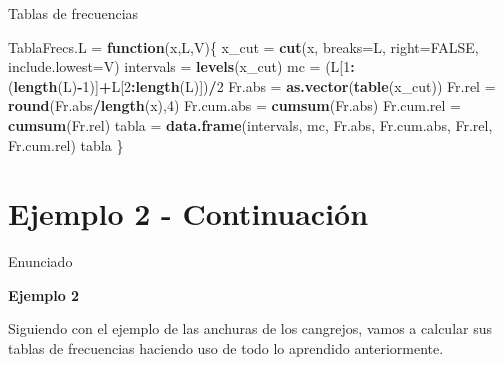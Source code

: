 \documentclass[
  ignorenonframetext,
]{beamer}
\newenvironment{Shaded}{\begin{snugshade}}{\end{snugshade}}
\newcommand{\ControlFlowTok}[1]{\textcolor[rgb]{0.13,0.29,0.53}{\textbf{#1}}}
\newcommand{\DataTypeTok}[1]{\textcolor[rgb]{0.13,0.29,0.53}{#1}}
\newcommand{\DecValTok}[1]{\textcolor[rgb]{0.00,0.00,0.81}{#1}}
\newcommand{\KeywordTok}[1]{\textcolor[rgb]{0.13,0.29,0.53}{\textbf{#1}}}
\newcommand{\NormalTok}[1]{#1}
\newcommand{\OperatorTok}[1]{\textcolor[rgb]{0.81,0.36,0.00}{\textbf{#1}}}
\newcommand{\OtherTok}[1]{\textcolor[rgb]{0.56,0.35,0.01}{#1}}
\newcommand{\StringTok}[1]{\textcolor[rgb]{0.31,0.60,0.02}{#1}}
\begin{document}
\begin{frame}[fragile]{Tablas de frecuencias}
\protect\hypertarget{tablas-de-frecuencias}{}

\begin{Shaded}
\begin{Highlighting}[]
\NormalTok{TablaFrecs.L =}\StringTok{ }\ControlFlowTok{function}\NormalTok{(x,L,V)\{}
\NormalTok{  x_cut =}\StringTok{ }\KeywordTok{cut}\NormalTok{(x, }\DataTypeTok{breaks=}\NormalTok{L, }\DataTypeTok{right=}\OtherTok{FALSE}\NormalTok{, }\DataTypeTok{include.lowest=}\NormalTok{V)}
\NormalTok{  intervals =}\StringTok{ }\KeywordTok{levels}\NormalTok{(x_cut)}
\NormalTok{  mc =}\StringTok{ }\NormalTok{(L[}\DecValTok{1}\OperatorTok{:}\NormalTok{(}\KeywordTok{length}\NormalTok{(L)}\OperatorTok{-}\DecValTok{1}\NormalTok{)]}\OperatorTok{+}\NormalTok{L[}\DecValTok{2}\OperatorTok{:}\KeywordTok{length}\NormalTok{(L)])}\OperatorTok{/}\DecValTok{2}
\NormalTok{  Fr.abs =}\StringTok{ }\KeywordTok{as.vector}\NormalTok{(}\KeywordTok{table}\NormalTok{(x_cut)) }
\NormalTok{  Fr.rel =}\StringTok{ }\KeywordTok{round}\NormalTok{(Fr.abs}\OperatorTok{/}\KeywordTok{length}\NormalTok{(x),}\DecValTok{4}\NormalTok{)}
\NormalTok{  Fr.cum.abs =}\StringTok{ }\KeywordTok{cumsum}\NormalTok{(Fr.abs)}
\NormalTok{  Fr.cum.rel =}\StringTok{ }\KeywordTok{cumsum}\NormalTok{(Fr.rel)}
\NormalTok{  tabla =}\StringTok{ }\KeywordTok{data.frame}\NormalTok{(intervals, mc, Fr.abs, Fr.cum.abs, Fr.rel, Fr.cum.rel)}
\NormalTok{  tabla}
\NormalTok{  \}}
\end{Highlighting}
\end{Shaded}

\end{frame}

\hypertarget{ejemplo-2---continuaciuxf3n}{%
\section{Ejemplo 2 - Continuación}\label{ejemplo-2---continuaciuxf3n}}

\begin{frame}{Enunciado}
\protect\hypertarget{enunciado-1}{}

\textbf{Ejemplo 2}

Siguiendo con el ejemplo de las anchuras de los cangrejos, vamos a
calcular sus tablas de frecuencias haciendo uso de todo lo aprendido
anteriormente.

\end{frame}
\end{document}
